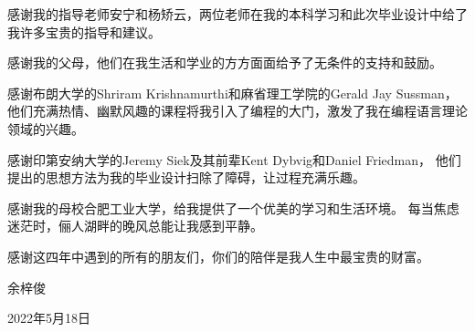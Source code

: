 
\begin{acknowledgements}

感谢我的指导老师安宁和杨矫云，两位老师在我的本科学习和此次毕业设计中给了我许多宝贵的指导和建议。
\begin{comment}
实验室的工作经历不仅拓宽了我的眼界，提高了我的实践能力，
也让我明白了科学技术在社会福祉中应起的责任。
\end{comment}

感谢我的父母，他们在我生活和学业的方方面面给予了无条件的支持和鼓励。

感谢布朗大学的Shriram Krishnamurthi和麻省理工学院的Gerald Jay Sussman，
他们充满热情、幽默风趣的课程将我引入了编程的大门，激发了我在编程语言理论领域的兴趣。

感谢印第安纳大学的Jeremy Siek及其前辈Kent Dybvig和Daniel Friedman，
他们提出的思想方法为我的毕业设计扫除了障碍，让过程充满乐趣。

感谢我的母校合肥工业大学，给我提供了一个优美的学习和生活环境。
每当焦虑迷茫时，俪人湖畔的晚风总能让我感到平静。

感谢这四年中遇到的所有的朋友们，你们的陪伴是我人生中最宝贵的财富。

\begin{flushright}
余梓俊

2022年5月18日
\end{flushright}


\end{acknowledgements}
